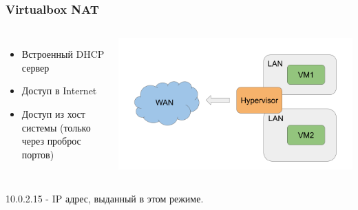 \begin{frame}
\frametitle{Virtualbox NAT}
	\begin{columns}
        \begin{itemize}
            \item Встроенный DHCP сервер
            \item Доступ в Internet
            \item Доступ из хост системы (только через проброс портов)
        \end{itemize}
    \includegraphics[height=0.4\textheight]{../../slides/vbox/Virtualbox network NAT.png}
    \end{columns}
    10.0.2.15 - IP адрес, выданный в этом режиме.
\end{frame}